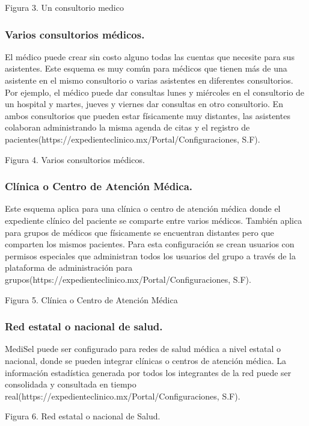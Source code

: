 Figura 3. Un consultorio medico


\subsubsection{Varios consultorios médicos.}
El médico puede crear sin costo alguno todas las cuentas que necesite para sus asistentes. Este esquema es muy común para médicos que tienen más de una asistente en el mismo consultorio o varias asistentes en diferentes consultorios. Por ejemplo, el médico puede dar consultas lunes y miércoles en el consultorio de un hospital y martes, jueves y viernes dar consultas en otro consultorio. En ambos consultorios que pueden estar físicamente muy distantes, las asistentes colaboran administrando la misma agenda de citas y el registro de pacientes(https://expedienteclinico.mx/Portal/Configuraciones, S.F).


				Figura 4. Varios consultorios médicos.



\subsubsection{Clínica o Centro de Atención Médica.}
Este esquema aplica para una clínica o centro de atención médica donde el expediente clínico del paciente se comparte entre varios médicos. También aplica para grupos de médicos que físicamente se encuentran distantes pero que comparten los mismos pacientes. Para esta configuración se crean usuarios con permisos especiales que administran todos los usuarios del grupo a través de la plataforma de administración para grupos(https://expedienteclinico.mx/Portal/Configuraciones, S.F).

				Figura 5. Clínica o Centro de Atención Médica



\subsubsection{Red estatal o nacional de salud.}
MediSel puede ser configurado para redes de salud médica a nivel estatal o nacional, donde se pueden integrar clínicas o centros de atención médica. La información estadística generada por todos los integrantes de la red puede ser consolidada y consultada en tiempo real(https://expedienteclinico.mx/Portal/Configuraciones, S.F).

				Figura 6. Red estatal o nacional de Salud.



